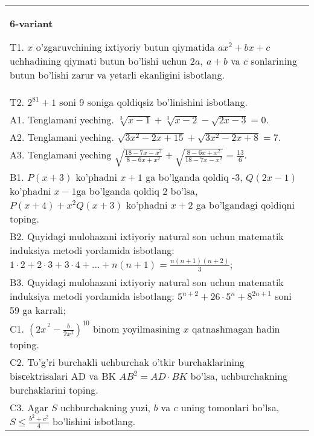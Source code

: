 \documentclass{article}
\begin{document}
\begin{tabular}{m{17cm}}
\textbf{6-variant}
\newline

T1. \(x\) o'zgaruvchining ixtiyoriy butun qiymatida \(ax^{2} + bx + c\) uchhadining qiymati butun bo'lishi uchun \(2a,\ a + b\) va \(c\) sonlarining butun bo'lishi zarur va yetarli ekanligini isbotlang. \\
T2. \(2^{81} + 1\) soni 9 soniga qoldiqsiz bo'linishini isbotlang. \\
A1. Tenglamani yeching. \(\sqrt[3]{x - 1} + \sqrt[3]{x - 2} - \sqrt{2x - 3} = 0\). \\
A2. Tenglamani yeching. \(\sqrt{3x^{2} - 2x + 15} + \sqrt{3x^{2} - 2x + 8} = 7\). \\
A3. Tenglamani yeching \(\sqrt{\frac{18 - 7x - x^{2}}{8 - 6x + x^{2}}} + \sqrt{\frac{8 - 6x + x^{2}}{18 - 7x - x^{2}}} = \frac{13}{6}\). \\
B1. \(P(x + 3)\) ko'phadni \(x + 1\) ga bo'lganda qoldiq -3, \(Q(2x - 1)\) ko'phadni \(x - 1\)ga bo'lganda qoldiq 2 bo'lsa, \(P(x + 4) + x^{2}Q(x + 3)\) ko'phadni \(x + 2\) ga bo'lgandagi qoldiqni toping. \\
B2. Quyidagi mulohazani ixtiyoriy natural son uchun matematik induksiya metodi yordamida isbotlang: \(1 \cdot 2 + 2 \cdot 3 + 3 \cdot 4 + ... + n(n + 1) = \frac{n(n + 1)(n + 2)}{3}\); \\
B3. Quyidagi mulohazani ixtiyoriy natural son uchun matematik induksiya metodi yordamida isbotlang: \(5^{n + 2} + 26 \cdot 5^{n} + 8^{2n + 1}\) soni 59 ga karrali; \\
C1. \(\left( 2x^{\ ^{2}} - \frac{b}{2x^{3}} \right)^{10}\) binom yoyilmasining \(x\) qatnashmagan hadin toping. \\
C2. To'g'ri burchakli uchburchak o'tkir burchaklarining bisєektrisalari AD va BK \(AB^{2} = AD \cdot BK\) bo'lsa, uchburchakning burchaklarini toping. \\
C3. Agar \(S\) uchburchakning yuzi, \(b\) va \(c\) uning tomonlari bo'lsa, \(S \leq \frac{b^{2} + c^{2}}{4}\) bo'lishini isbotlang. \\

\end{tabular}
\vspace{1cm}
\end{document}
